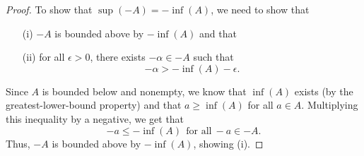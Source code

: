 \documentclass[11pt,a4paper]{article}
\begin{document}
\begin{enumerate}
\begin{enumerate}
\begin{proof}
            To show that \( \sup(-A) = - \inf(A) \), we need to show that  
            \begin{enumerate}
                \item[(i)] \( -A  \) is bounded above by \( - \inf (A) \) and that
                \item[(ii)] for all \( \epsilon > 0  \), there exists \( - \alpha \in -A  \) such that 
                    \[  - \alpha > - \inf(A) - \epsilon. \]
            \end{enumerate}
            Since \( A  \) is bounded below and nonempty, we know that \( \inf(A) \) exists (by the greatest-lower-bound property) and that \( a \geq \inf(A) \) for all \( a \in A  \). Multiplying this inequality by a negative, we get that
            \[  - a \leq - \inf(A) \ \ \text{for all} \ -a \in - A. \]
            Thus, \( -A  \) is bounded above by \( - \inf(A) \), showing (i).


\end{proof}
\end{enumerate}
\end{enumerate}
\end{document}
